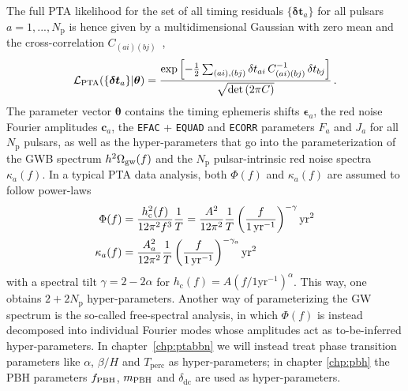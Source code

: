 The full \ac{PTA} likelihood for the set of all  timing residuals $\{\bm{\delta t}_a\}$ for all pulsars $a = 1, ..., N_\text{p}$ is hence given by a multidimensional Gaussian with zero mean and the cross-correlation $C_{(ai)(bj)}$~\cite{Maggiore:2018sht},
\begin{align}
	\mathcal{L}_\text{PTA}(\{ \bm{\delta t}_a\}| \bm{\theta}) = \frac{\exp \left[  -\frac{1}{2}
		\sum_{(ai),(bj)} \delta t_{ai} \, C_{(ai)(bj)}^{-1} \, \delta t_{bj}
	 \right]}{\sqrt{\text{det}\left( 2 \pi C \right)}} \, . \label{eq:PTAlikelihood}
\end{align}
The parameter vector $\bm{\theta}$ contains the timing ephemeris shifts $\bm{\epsilon}_a$, the red noise Fourier amplitudes $\bm{c}_a$, the \texttt{EFAC} + \texttt{EQUAD} and \texttt{ECORR} parameters  $F_a$ and $J_a$ for all $N_\text{p}$ pulsars,  as well as the hyper-parameters that go into the parameterization of the \ac{GWB} spectrum $h^2 \Omega_{\text{gw}}(f)$ and the $N_\text{p}$ pulsar-intrinsic  red noise spectra $\kappa_a(f)$. In a typical \ac{PTA} data analysis, both $\Phi(f)$ and $\kappa_a(f)$ are assumed to follow power-laws
\begin{subequations}
	\begin{align}
		\Phi(f) &= \frac{h_\text{c}^2(f)}{12 \pi^2 f^3} \frac{1}{T} = \frac{A^2}{12 \pi^2} \frac{1}{T} \left( \frac{f}{1 \, \text{yr}^{-1} } \right)^{-\gamma} \text{yr}^2 \label{eq:Phif}\\
		\kappa_a(f) &= \frac{A_a^2}{12 \pi^2} \frac{1}{T} \left( \frac{f}{1 \, \text{yr}^{-1}} \right)^{-\gamma_a} \text{yr}^2 \label{eq:kappaaf}
	\end{align}
\end{subequations}
with a spectral tilt $\gamma= 2 - 2 \alpha$ for $h_\text{c}(f) = A (f/ 1 \text{yr}^{-1})^\alpha$. This way, one obtains $2 + 2 N_\text{p}$ hyper-parameters. Another way of parameterizing the \ac{GW} spectrum is the so-called free-spectral analysis, in which $\Phi(f)$ is instead decomposed into individual Fourier modes whose amplitudes act as to-be-inferred  hyper-parameters. In chapter~\ref{chp:ptabbn} we will instead treat phase transition parameters like $\alpha$, $\beta/H$ and $T_\text{perc}$ as hyper-parameters; in chapter \ref{chp:pbh} the PBH parameters $f_{\mathrm{PBH}}$, $m_{\mathrm{PBH}}$ and $\delta_\text{dc}$ are used as hyper-parameters.

